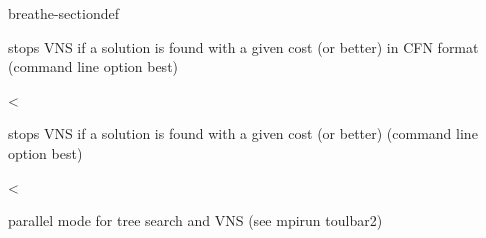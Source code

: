 \documentclass[letterpaper,10pt,openany,oneside,english]{sphinxmanual}
\begin{document}
\begin{fulllineitems}
\begin{sphinxuseclass}{breathe-sectiondef}
\begin{fulllineitems}
\sphinxAtStartPar
stops VNS if a solution is found with a given cost (or better) in CFN format (command line option \sphinxhyphen{}best) 

\end{fulllineitems}


\begin{fulllineitems}
\label{\detokenize{ref/ref_cpp:_CPPv4N8ToulBar28parallelE}}\label{\detokenize{ref/ref_cpp:_CPPv3N8ToulBar28parallelE}}\label{\detokenize{ref/ref_cpp:_CPPv2N8ToulBar28parallelE}}\label{\detokenize{ref/ref_cpp:ToulBar2::parallel__b}}
\pysigstartsignatures
\pysigstartmultiline
{}
\pysigstopmultiline
\pysigstopsignatures
\sphinxAtStartPar
\textless{} 

\sphinxAtStartPar
stops VNS if a solution is found with a given cost (or better) (command line option \sphinxhyphen{}best) 

\end{fulllineitems}


\begin{fulllineitems}
\label{\detokenize{ref/ref_cpp:_CPPv4N8ToulBar24hbfsE}}\label{\detokenize{ref/ref_cpp:_CPPv3N8ToulBar24hbfsE}}\label{\detokenize{ref/ref_cpp:_CPPv2N8ToulBar24hbfsE}}\label{\detokenize{ref/ref_cpp:ToulBar2::hbfs__Long}}
\pysigstartsignatures
\pysigstartmultiline
{}
\pysigstopmultiline
\pysigstopsignatures
\sphinxAtStartPar
\textless{} 

\sphinxAtStartPar
parallel mode for tree search and VNS (see mpirun toulbar2) 

\end{fulllineitems}



\end{sphinxuseclass}
\end{fulllineitems}
\end{document}
